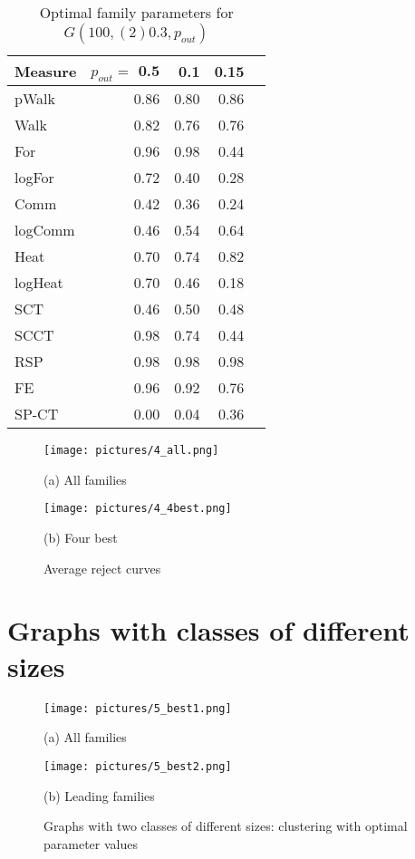 \documentclass{article}
\begin{document}
\begin{table}[H]
	\begin{tabular}{lrrrr}
			\toprule
Measure & $p_{out}=$ 0.5 & 0.1 & 0.15\\
		\midrule
pWalk & 0.86 & 0.80 & 0.86\\
Walk & 0.82 & 0.76 & 0.76\\
For & 0.96 & 0.98 & 0.44\\
logFor & 0.72 & 0.40 & 0.28\\
Comm & 0.42 & 0.36 & 0.24\\
logComm & 0.46 & 0.54 & 0.64\\
Heat & 0.70 & 0.74 & 0.82\\
logHeat & 0.70 & 0.46 & 0.18\\
SCT & 0.46 & 0.50 & 0.48\\
SCCT & 0.98 & 0.74 & 0.44\\
RSP & 0.98 & 0.98 & 0.98\\
FE & 0.96 & 0.92 & 0.76\\
SP-CT & 0.00 & 0.04 & 0.36\\
		\bottomrule
	\end{tabular}\caption{\label{t_4_opt} Optimal family parameters for $G(100, (2)0.3, p_{out})$}
\end{table}

\begin{figure}[H]
	\begin{minipage}{.49\textwidth}
		\texttt{[image: pictures/4\_all.png]}\\
		\centerline{(a) All families}
	\end{minipage}
	\begin{minipage}{.49\textwidth}
		\texttt{[image: pictures/4\_4best.png]}\\
		\centerline{(b) Four best}
	\end{minipage}
\caption{\label{f_Rcur}Average reject curves}
\end{figure}

\newpage
\section{Graphs with classes of different sizes}
\begin{figure}[H]
	\begin{minipage}{.49\textwidth}
		\texttt{[image: pictures/5\_best1.png]}\\
		\centerline{(a) All families}
	\end{minipage}%
	\begin{minipage}{.49\textwidth}
		\texttt{[image: pictures/5\_best2.png]}\\
		\centerline{(b) Leading families}
	\end{minipage}
\caption{\label{f_difClas}Graphs with two classes of different sizes: clustering with optimal parameter values}
\end{figure}
\end{document}
